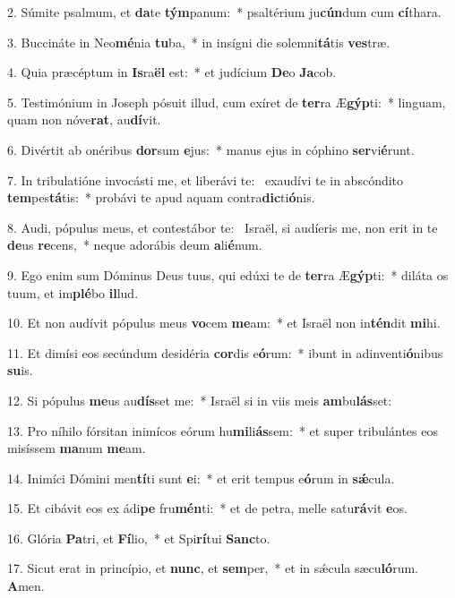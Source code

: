 2. Súmite psalmum, et \textbf{da}te \textbf{tým}panum:~*  psaltérium ju\textbf{cún}dum cum \textbf{cí}thara.\

3. Buccináte in Neo\textbf{mé}nia \textbf{tu}ba,~*  in insígni die solemni\textbf{tá}tis \textbf{ves}træ.\

4. Quia præcéptum in \textbf{Is}ra\textbf{ël} est:~*  et judícium \textbf{De}o \textbf{Ja}cob.\

5. Testimónium in Joseph pósuit illud, cum exíret de \textbf{ter}ra Æ\textbf{gýp}ti:~*  linguam, quam non nóve\textbf{rat}, au\textbf{dí}vit.\

6. Divértit ab onéribus \textbf{dor}sum \textbf{e}jus:~*  manus ejus in cóphino \textbf{ser}vi\textbf{é}runt.\

7. In tribulatióne invocásti me, et liberávi te: \dag\  exaudívi te in abscóndito \textbf{tem}pes\textbf{tá}tis:~*  probávi te apud aquam contra\textbf{dic}ti\textbf{ó}nis.\

8. Audi, pópulus meus, et contestábor te: \dag\  Israël, si audíeris me, non erit in te \textbf{de}us \textbf{re}cens,~*  neque adorábis deum \textbf{a}li\textbf{é}num.\

9. Ego enim sum Dóminus Deus tuus, qui edúxi te de \textbf{ter}ra Æ\textbf{gýp}ti:~*  diláta os tuum, et im\textbf{plé}bo \textbf{il}lud.\

10. Et non audívit pópulus meus \textbf{vo}cem \textbf{me}am:~*  et Israël non in\textbf{tén}dit \textbf{mi}hi.\

11. Et dimísi eos secúndum desidéria \textbf{cor}dis e\textbf{ó}rum:~*  ibunt in adinventi\textbf{ó}nibus \textbf{su}is.\

12. Si pópulus \textbf{me}us au\textbf{dís}set me:~*  Israël si in viis meis \textbf{am}bu\textbf{lás}set:\

13. Pro níhilo fórsitan inimícos eórum hu\textbf{mi}li\textbf{ás}sem:~*  et super tribulántes eos misíssem \textbf{ma}num \textbf{me}am.\

14. Inimíci Dómini men\textbf{tí}ti sunt \textbf{e}i:~*  et erit tempus e\textbf{ó}rum in \textbf{sǽ}cula.\

15. Et cibávit eos ex ádi\textbf{pe} fru\textbf{mén}ti:~*  et de petra, melle satu\textbf{rá}vit \textbf{e}os.\

16. Glória \textbf{Pa}tri, et \textbf{Fí}lio,~*  et Spi\textbf{rí}tui \textbf{Sanc}to.\

17. Sicut erat in princípio, et \textbf{nunc}, et \textbf{sem}per,~*  et in sǽcula sæcu\textbf{ló}rum. \textbf{A}men.\

